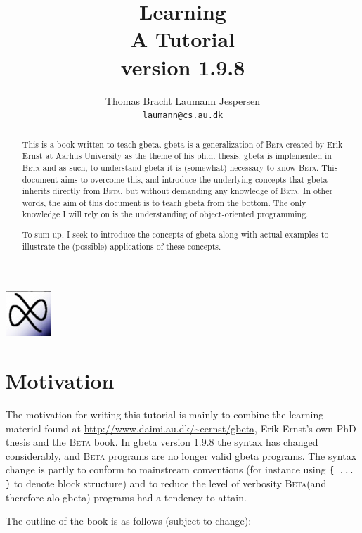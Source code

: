 \documentclass[openany]{memoir}
\author{Thomas Bracht Laumann Jespersen\\ \texttt{laumann@cs.au.dk}}
\title{Learning \gbeta\\ A Tutorial\\\normalsize \gbeta version 1.9.8}
\newcommand{\gbeta}{\textsf{gbeta}\xspace}
\renewcommand{\beta}{\textsc{Beta}\xspace}
\begin{document}
\frontmatter

\maketitle

\begin{center}
  \includegraphics[scale=0.5]{pics/logo}
\end{center}

\begin{abstract}
  This is a book written to teach \gbeta . \gbeta is a generalization
  of \beta created by Erik Ernst at Aarhus University as the theme of
  his ph.d. thesis. \gbeta is implemented in \beta and as such, to
  understand \gbeta it is (somewhat) necessary to know \beta . This
  document aims to overcome this, and introduce the underlying
  concepts that \gbeta inherits directly from \beta , but without
  demanding any knowledge of \beta . In other words, the aim of this
  document is to teach \gbeta from the bottom. The only knowledge I
  will rely on is the understanding of object-oriented
  programming.

  To sum up, I seek to introduce the concepts of \gbeta along with
  actual examples to illustrate the (possible) applications of these
  concepts.

\end{abstract}

\newpage

\tableofcontents

\chapter{Motivation}

The motivation for writing this tutorial is mainly to combine the
learning material found at \url{http://www.daimi.au.dk/~eernst/gbeta},
Erik Ernst's own PhD thesis \cite{ernst99b} and the \beta book. In \gbeta version
1.9.8 the syntax has changed considerably, and \beta programs are
no longer valid \gbeta programs. The syntax change is partly to
conform to mainstream conventions (for instance using \verb|{ ... }| to denote
block structure) and to reduce the level of verbosity \beta (and
therefore alo \gbeta ) programs had a tendency to attain.

The outline of the book is as follows (subject to change):
\end{document}
